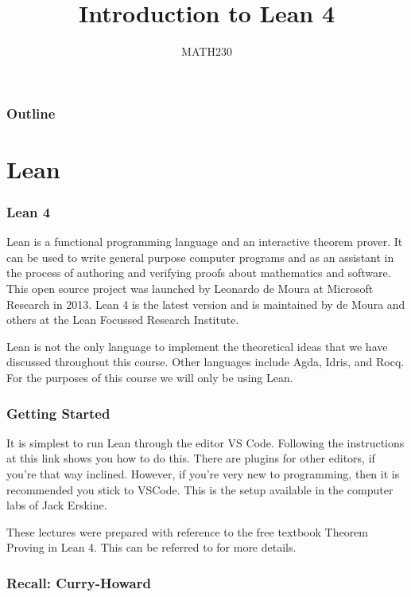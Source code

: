 \documentclass{beamer}
\title{Introduction to Lean 4}
\author{MATH230}
\institute{School of Mathematics and Statistics \\ University of Canterbury}
\date{}
\theoremstyle{indentDefn} \newtheorem{defn}[]{Definition}
\begin{document}
\begin{frame}

  \titlepage

\end{frame}

\begin{frame}
  \frametitle{Outline}

  \tableofcontents

\end{frame}

\section{Lean}

\begin{frame}
\frametitle{Lean 4}
Lean is a functional programming language and an interactive theorem prover. It can be used to write general purpose computer programs and as an assistant in the process of authoring and verifying proofs about mathematics and software. This open source project was launched by Leonardo de Moura at Microsoft Research in 2013. Lean 4 is the latest version and is maintained by de Moura and others at the Lean Focussed Research Institute.

Lean is not the only language to implement the theoretical ideas that we have discussed throughout this course. Other languages include Agda, Idris, and Rocq. For the purposes of this course we will only be using Lean. 
\end{frame}

\begin{frame}
\frametitle{Getting Started}

It is simplest to run Lean through the editor VS Code. Following the instructions at this link shows you how to do this. There are plugins for other editors, if you're that way inclined. However, if you're very new to programming, then it is recommended you stick to VSCode. This is the setup available in the computer labs of Jack Erskine. 

These lectures were prepared with reference to the free textbook Theorem Proving in Lean 4. This can be referred to for more details.
\end{frame}

\begin{frame}
\frametitle{Recall: Curry-Howard}


\end{frame}
\end{document}
